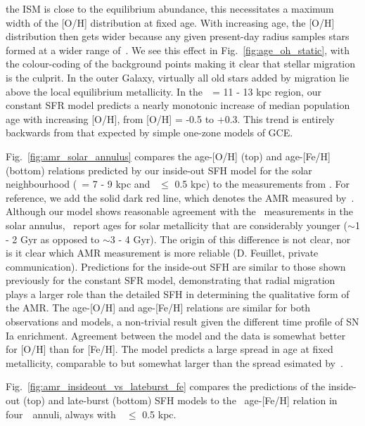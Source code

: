 \documentclass[draft2.tex]{subfiles}
\begin{document}
the ISM is close to the equilibrium abundance, this necessitates a maximum 
width of the [O/H] distribution at fixed age. 
With increasing age, the [O/H] distribution then gets wider because any given 
present-day radius samples stars formed at a wider range of~\rgal. 
We see this effect in Fig.~\ref{fig:age_oh_static}, with the colour-coding of 
the background points making it clear that stellar migration 
is the culprit. 
In the outer Galaxy, virtually all old stars added by migration lie above the 
local equilibrium metallicity. 
In the~\rgal~= 11 - 13 kpc region, our constant SFR model predicts a nearly 
monotonic increase of median population age with increasing [O/H], from 
[O/H] = -0.5 to +0.3. 
This trend is entirely backwards from that expected by simple one-zone models 
of GCE. 
\par 
Fig.~\ref{fig:amr_solar_annulus} compares the age-[O/H] (top) and 
age-[Fe/H] (bottom) relations predicted by our inside-out SFH model for the 
solar neighbourhood (\rgal~= 7 - 9 kpc and \absz~$\leq$ 0.5 kpc) to the 
measurements from \citet{Feuillet2019}. 
For reference, we add the solid dark red line, which denotes the AMR measured 
by~\citet{Feuillet2018}. 
Although our model shows reasonable agreement with the~\citet{Feuillet2019} 
measurements in the solar annulus,~\citet{Feuillet2018} report ages for solar 
metallicity that are considerably younger ($\sim$1 - 2 Gyr as opposed to 
$\sim$3 - 4 Gyr). 
The origin of this difference is not clear, nor is it clear which AMR 
measurement is more reliable (D. Feuillet, private communication). 
Predictions for the inside-out SFH are similar to those shown previously 
for the constant SFR model, demonstrating that radial migration plays a larger 
role than the detailed SFH in determining the qualitative form of the AMR. 
The age-[O/H] and age-[Fe/H] relations are similar for both observations and 
models, a non-trivial result given the different time profile of SN Ia 
enrichment. 
Agreement between the model and the data is somewhat better for [O/H] than for 
[Fe/H]. 
The model predicts a large spread in age at fixed metallicity, comparable to 
but somewhat larger than the spread esimated by~\citet{Feuillet2019}. 
\par
Fig.~\ref{fig:amr_insideout_vs_lateburst_fe} compares the predictions of the 
inside-out (top) and late-burst (bottom) SFH models to the~\citet{Feuillet2019} 
age-[Fe/H] relation in four~\rgal~annuli, always with~\absz~$\leq$ 0.5 kpc. 
\end{document}
